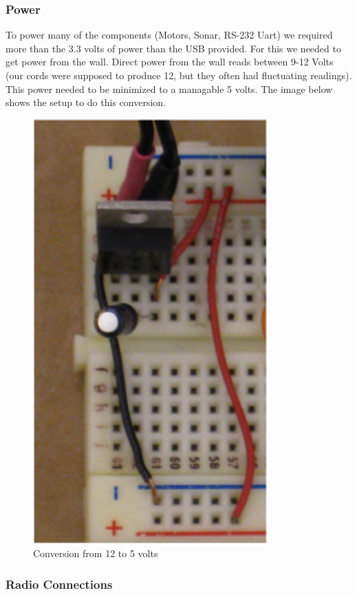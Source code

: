 \subsubsection{Power}
To power many of the components (Motors, Sonar, RS-232 Uart) we required more than the 3.3 volts of power than the USB provided. For this we needed to get power from the wall. Direct power from the wall reads between 9-12 Volts (our cords were supposed to produce 12, but they often had fluctuating readings).  This power needed to be minimized to a managable 5 volts.  The image below shows the setup to do this conversion.
\begin{figure}[h]
  \begin{center}
    \includegraphics[width=90mm]{imageSources/power12to5.png}
  \end{center}
  \caption{Conversion from 12 to 5 volts} 
  \label{power12to5}
\end{figure}

\subsubsection{Radio Connections}
\label{radioconn}

